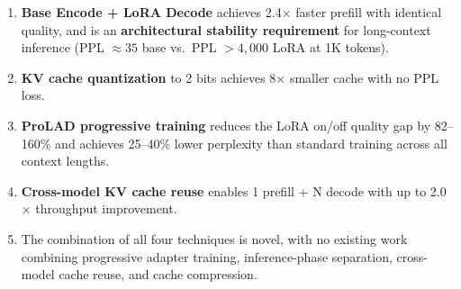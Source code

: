 \documentclass[11pt]{article}
\begin{document}
\begin{enumerate}
    \item \textbf{Base Encode + LoRA Decode} achieves 2.4$\times$ faster prefill with identical quality, and is an \textbf{architectural stability requirement} for long-context inference (PPL $\approx 35$ base vs.~PPL $> 4{,}000$ LoRA at 1K tokens).
    \item \textbf{KV cache quantization} to 2 bits achieves 8$\times$ smaller cache with no PPL loss.
    \item \textbf{ProLAD progressive training} reduces the LoRA on/off quality gap by 82--160\% and achieves 25--40\% lower perplexity than standard training across all context lengths.
    \item \textbf{Cross-model KV cache reuse} enables 1 prefill + N decode with up to 2.0$\times$ throughput improvement.
    \item The combination of all four techniques is novel, with no existing work combining progressive adapter training, inference-phase separation, cross-model cache reuse, and cache compression.
\end{enumerate}
\end{document}
